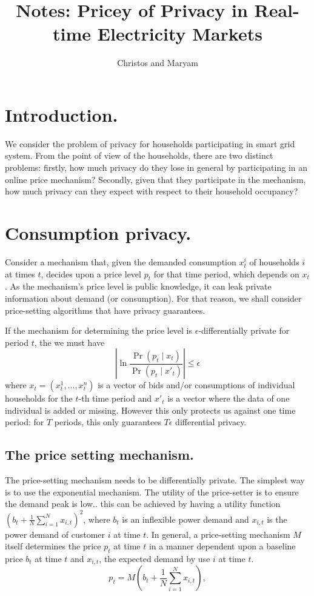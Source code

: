 \documentclass[a4paper,onecolumn]{article}
\numberwithin{algorithm}{section}
\theoremstyle{plain}
\theoremstyle{definition}
\theoremstyle{example}
\newcommand{\demand}{x}
\newcommand{\price}{p}
\newcommand{\nmech}{M}
\newcommand{\baseline}{b}
\begin{document}
 
\title{Notes: Pricey of Privacy in Real-time Electricity Markets}

\author{Christos and Maryam}
\maketitle

\section{Introduction.}

We consider the problem of privacy for households participating in
smart grid system. From the point of view of the households, there are
two distinct problems: firstly, how much privacy do they lose in
general by participating in an online price mechanism? Secondly, given
that they participate in the mechanism, how much privacy can they
expect with respect to their household occupancy?

\section{Consumption privacy.}

Consider a mechanism that, given the demanded consumption
$\demand_t^i$ of households $i$ at times $t$, decides upon a price
level $\price_{t}$ for that time period, which depends on
$\demand_{t}$. As the mechanism's price level is public knowledge, it
can leak private information about demand (or consumption). For that
reason, we shall consider price-setting algorithms that have privacy
guarantees.

If the mechanism for determining the price level is
$\epsilon$-differentially private for period $t$, the we must have
\[
\left|
  \ln \frac{\Pr(\price_t \mid \demand_t)}{\Pr(\price_t \mid x'_t)}
\right|
 \leq \epsilon
\]
where $\demand_t = (\demand^1_t, \ldots, \demand^n_t)$ is a vector of
bids and/or consumptions of individual households for the $t$-th time
period and $x'_t$ is a vector where the data of one individual is
added or missing.  However this only protects us against one time
period: for $T$ periods, this only guarantees $T \epsilon$
differential privacy.


\subsection{The price setting mechanism.}
The price-setting mechanism needs to be differentially private. The simplest way is to use the exponential mechanism. The utility of the price-setter is to ensure the demand peak is low.. this can be achieved by having a utility function $\left(\baseline_t + \frac{1}{N}\sum_{i=1}^N \demand_{i,t}\right)^2$, where $\baseline_t$ is an inflexible power demand and $\demand_{i,t}$ is the power demand of customer $i$ at time $t$. 
In general, a price-setting mechanism $\nmech$ itself determines the price $\price_t$ at time $t$ in a manner dependent upon a baseline price $\baseline_t$ at time $t$ and $\demand_{i,t}$, the expected demand by use $i$ at time $t$.
\[
\price_t = \nmech\left(\baseline_t + \frac{1}{N}\sum_{i=1}^N \demand_{i,t}\right),
\]
\end{document}

